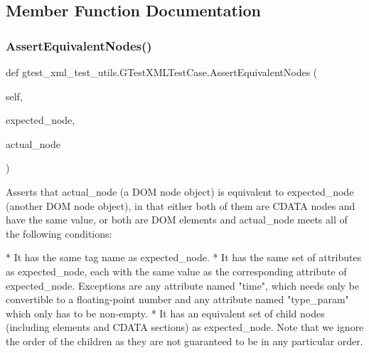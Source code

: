 \subsection{Member Function Documentation}
\mbox{\label{classgtest__xml__test__utils_1_1_g_test_x_m_l_test_case_a977273e8863f4f41d121bb5a64b08d32}} 
\subsubsection{\texorpdfstring{Assert\+Equivalent\+Nodes()}{AssertEquivalentNodes()}}
{\footnotesize\ttfamily def gtest\+\_\+xml\+\_\+test\+\_\+utils.\+G\+Test\+X\+M\+L\+Test\+Case.\+Assert\+Equivalent\+Nodes (\begin{DoxyParamCaption}\item[{}]{self,  }\item[{}]{expected\+\_\+node,  }\item[{}]{actual\+\_\+node }\end{DoxyParamCaption})}

\begin{DoxyVerb}Asserts that actual_node (a DOM node object) is equivalent to
expected_node (another DOM node object), in that either both of
them are CDATA nodes and have the same value, or both are DOM
elements and actual_node meets all of the following conditions:

*  It has the same tag name as expected_node.
*  It has the same set of attributes as expected_node, each with
   the same value as the corresponding attribute of expected_node.
   Exceptions are any attribute named "time", which needs only be
   convertible to a floating-point number and any attribute named
   "type_param" which only has to be non-empty.
*  It has an equivalent set of child nodes (including elements and
   CDATA sections) as expected_node.  Note that we ignore the
   order of the children as they are not guaranteed to be in any
   particular order.
\end{DoxyVerb}
 \mbox{\label{classgtest__xml__test__utils_1_1_g_test_x_m_l_test_case_ac4823e96c3b5327b25a340a3605447d9}} 
